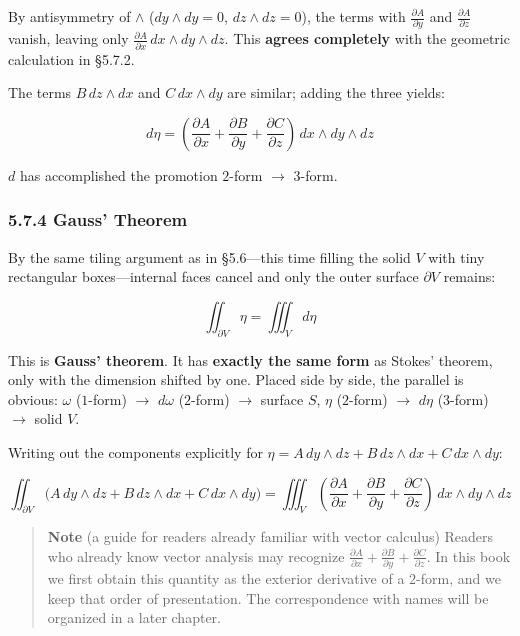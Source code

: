 \documentclass[a4paper,12pt,openany]{book}
\begin{document}
By antisymmetry of \(\wedge\) (\(dy \wedge dy = 0\),
\(dz \wedge dz = 0\)), the terms with \(\frac{\partial A}{\partial y}\)
and \(\frac{\partial A}{\partial z}\) vanish, leaving only
\(\frac{\partial A}{\partial x}\,dx \wedge dy \wedge dz\). This
\textbf{agrees completely} with the geometric calculation in §5.7.2.

The terms \(B\,dz \wedge dx\) and \(C\,dx \wedge dy\) are similar;
adding the three yields:

\[d\eta = (\frac{\partial A}{\partial x} + \frac{\partial B}{\partial y} + \frac{\partial C}{\partial z})\,dx \wedge dy \wedge dz\]

\(d\) has accomplished the promotion \(2\)-form \(\to\) \(3\)-form.

\hypertarget{gauss-theorem}{%
\subsubsection{5.7.4 Gauss' Theorem}\label{gauss-theorem}}

By the same tiling argument as in §5.6—this time filling the solid
\(V\) with tiny rectangular boxes—internal faces cancel and only the
outer surface \(\partial V\) remains:

\[\iint_{\partial V} \eta = \iiint_V d\eta\]

This is \textbf{Gauss' theorem}. It has \textbf{exactly the same form}
as Stokes' theorem, only with the dimension shifted by one. Placed side
by side, the parallel is obvious: \(\omega\) (\(1\)-form) \(\to\)
\(d\omega\) (\(2\)-form) \(\to\) surface \(S\), \(\eta\) (\(2\)-form)
\(\to\) \(d\eta\) (\(3\)-form) \(\to\) solid \(V\).

Writing out the components explicitly for
\(\eta = A\,dy \wedge dz + B\,dz \wedge dx + C\,dx \wedge dy\):

\[\iint_{\partial V} \bigl(A\,dy \wedge dz + B\,dz \wedge dx + C\,dx \wedge dy\bigr) = \iiint_V (\frac{\partial A}{\partial x} + \frac{\partial B}{\partial y} + \frac{\partial C}{\partial z})\,dx \wedge dy \wedge dz\]

\begin{quote}
\textbf{Note} (a guide for readers already familiar with vector
calculus) Readers who already know vector analysis may recognize
\(\frac{\partial A}{\partial x}+\frac{\partial B}{\partial y}+\frac{\partial C}{\partial z}\).
In this book we first obtain this quantity as the exterior derivative of
a \(2\)-form, and we keep that order of presentation. The correspondence
with names will be organized in a later chapter.
\end{quote}
\end{document}
